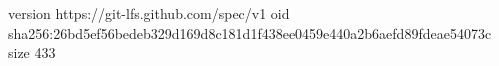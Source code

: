 version https://git-lfs.github.com/spec/v1
oid sha256:26bd5ef56bedeb329d169d8c181d1f438ee0459e440a2b6aefd89fdeae54073c
size 433
